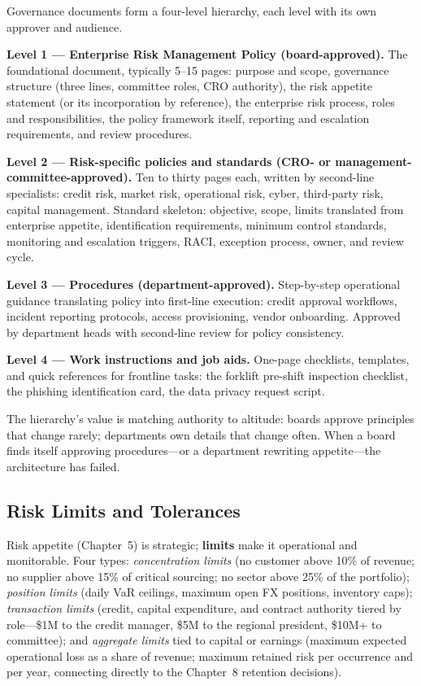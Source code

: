 \documentclass[11pt,openany]{book}
\begin{document}
Governance documents form a four-level hierarchy, each level with its own
approver and audience.

\textbf{Level 1 --- Enterprise Risk Management Policy (board-approved).} The
foundational document, typically 5--15 pages: purpose and scope, governance
structure (three lines, committee roles, CRO authority), the risk appetite
statement (or its incorporation by reference), the enterprise risk process,
roles and responsibilities, the policy framework itself, reporting and
escalation requirements, and review procedures.

\textbf{Level 2 --- Risk-specific policies and standards (CRO- or
management-committee-approved).} Ten to thirty pages each, written by
second-line specialists: credit risk, market risk, operational risk, cyber,
third-party risk, capital management. Standard skeleton: objective, scope,
limits translated from enterprise appetite, identification requirements,
minimum control standards, monitoring and escalation triggers, RACI,
exception process, owner, and review cycle.

\textbf{Level 3 --- Procedures (department-approved).} Step-by-step
operational guidance translating policy into first-line execution: credit
approval workflows, incident reporting protocols, access provisioning, vendor
onboarding. Approved by department heads with second-line review for policy
consistency.

\textbf{Level 4 --- Work instructions and job aids.} One-page checklists,
templates, and quick references for frontline tasks: the forklift pre-shift
inspection checklist, the phishing identification card, the data privacy
request script.

The hierarchy's value is matching authority to altitude: boards approve
principles that change rarely; departments own details that change often.
When a board finds itself approving procedures---or a department rewriting
appetite---the architecture has failed.

\subsection{Risk Limits and Tolerances}

Risk appetite (Chapter~5) is strategic; \textbf{limits} make it operational
and monitorable. Four types: \emph{concentration limits} (no customer above
10\% of revenue; no supplier above 15\% of critical sourcing; no sector above
25\% of the portfolio); \emph{position limits} (daily VaR ceilings, maximum
open FX positions, inventory caps); \emph{transaction limits} (credit,
capital expenditure, and contract authority tiered by role---\$1M to the
credit manager, \$5M to the regional president, \$10M+ to committee); and
\emph{aggregate limits} tied to capital or earnings (maximum expected
operational loss as a share of revenue; maximum retained risk per occurrence
and per year, connecting directly to the Chapter~8 retention decisions).
\end{document}
